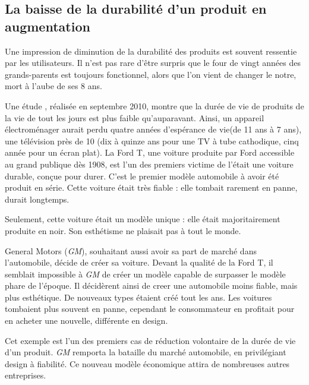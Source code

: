 \subsection{La baisse de la durabilité d'un produit en augmentation}

Une impression de diminution de la durabilité des produits est souvent ressentie par les utilisateurs.  Il n'est pas rare d'être surpris que le four de vingt années des grands-parents est toujours fonctionnel, alors que l'on vient de changer le notre, mort à l'aube de ses 8 ans. 

Une étude \cite{opSsg}, réalisée en septembre 2010, montre que la durée de vie de produits de la vie de tout les jours est plus faible qu'auparavant. Ainsi, un appareil électroménager aurait perdu quatre années d'espérance de vie(de 11 ans à 7 ans), une télévision près de 10 (dix à quinze ans pour une TV à tube cathodique, cinq année pour un écran plat). 
\smallbreak
La Ford T, une voiture produite par Ford accessible au grand publique dès 1908, est l'un des premiers victime de l'\op était une voiture durable, conçue pour durer.  C'est le premier modèle automobile à avoir été produit en série. Cette voiture était très fiable : elle tombait rarement en panne, durait longtemps. 

Seulement, cette voiture était un modèle unique : elle était majoritairement produite en noir. Son esthétisme ne plaisait pas à tout le monde. 

General Motors (\textit{GM}), souhaitant aussi avoir sa part de marché dans l'automobile, décide de créer sa voiture. Devant la qualité de la Ford T, il semblait impossible à \textit{GM} de créer un modèle capable de surpasser le modèle phare de l'époque. Il décidèrent ainsi de creer une automobile moins fiable, mais plus esthétique. De nouveaux types étaient créé tout les ans. Les voitures tombaient plus souvent en panne, cependant le consommateur en profitait pour en acheter une nouvelle, différente en design. 

Cet exemple est l'un des premiers cas de réduction volontaire de la durée de vie d'un produit. \textit{GM} remporta la bataille du marché automobile, en privilégiant design à fiabilité. Ce nouveau modèle économique attira de nombreuses autres entreprises. 


